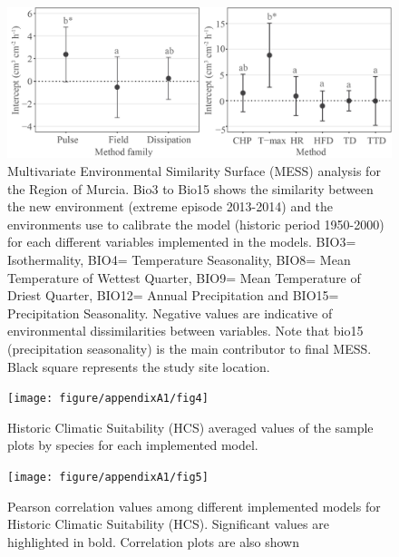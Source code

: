 \documentclass[11pt,twoside]{reedthesis}
\begin{document}
\newpage
\begin{landscape}
\begin{figure}[hbt!]

{\centering \includegraphics[width=0.8\linewidth]{figure/appendixA1/fig3} 

}

\caption[Multivariate Environmental Similarity Surface (MESS) analyses of the extreme drought year]{Multivariate Environmental Similarity Surface (MESS) analysis for the Region of Murcia. Bio3 to Bio15 shows the similarity between the new environment (extreme episode 2013-2014) and the environments use to calibrate the model (historic period 1950-2000) for each different variables  implemented  in  the  models. BIO3= Isothermality, BIO4= Temperature Seasonality, BIO8= Mean Temperature of Wettest Quarter, BIO9= Mean Temperature of Driest Quarter, BIO12= Annual Precipitation and BIO15= Precipitation Seasonality. Negative values are  indicative  of  environmental dissimilarities  between variables.  Note that bio15 (precipitation seasonality) is  the main contributor to final MESS. Black square represents the study site location.}\label{fig:apa13}
\end{figure}
\begin{figure}[hbt!]

{\centering \texttt{[image: figure/appendixA1/fig4]} 

}

\caption[Historic Climatic Suitability (HCS) averaged values of the sample plots by species for each implemented model]{Historic Climatic Suitability (HCS) averaged values of the sample plots by species for each implemented model.}\label{fig:apa14}
\end{figure}
\newpage
\end{landscape}\begin{figure}[hbt!]
{\centering \texttt{[image: figure/appendixA1/fig5]} 

}

\caption[Pearson correlation values among different implemented models for HCS]{Pearson correlation values among different implemented models for Historic Climatic Suitability (HCS). Significant values are highlighted in bold. Correlation plots are also shown}\label{fig:apa15}
\end{figure}\newpage
\end{document}
